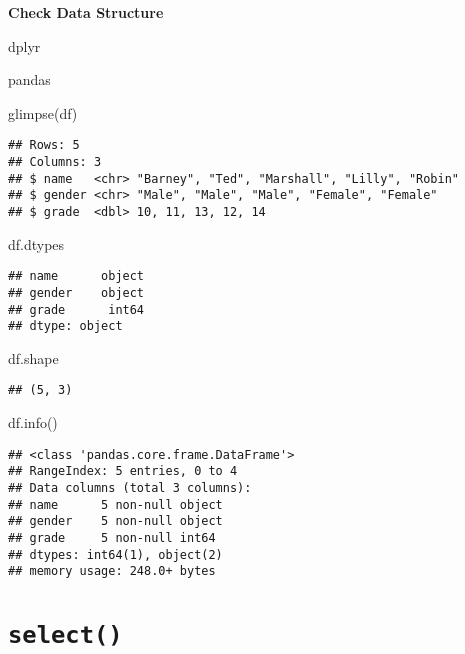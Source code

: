 \documentclass[
]{book}
\newenvironment{Shaded}{\begin{snugshade}}{\end{snugshade}}
\newcommand{\FunctionTok}[1]{\textcolor[rgb]{0.00,0.00,0.00}{#1}}
\newcommand{\NormalTok}[1]{#1}
\begin{document}
{\textbf{Check Data Structure}}

dplyr

pandas

\begin{Shaded}
\begin{Highlighting}[]
\FunctionTok{glimpse}\NormalTok{(df)}
\end{Highlighting}
\end{Shaded}

\begin{verbatim}
## Rows: 5
## Columns: 3
## $ name   <chr> "Barney", "Ted", "Marshall", "Lilly", "Robin"
## $ gender <chr> "Male", "Male", "Male", "Female", "Female"
## $ grade  <dbl> 10, 11, 13, 12, 14
\end{verbatim}

\begin{Shaded}
\begin{Highlighting}[]
\NormalTok{df.dtypes}
\end{Highlighting}
\end{Shaded}

\begin{verbatim}
## name      object
## gender    object
## grade      int64
## dtype: object
\end{verbatim}

\begin{Shaded}
\begin{Highlighting}[]
\NormalTok{df.shape}
\end{Highlighting}
\end{Shaded}

\begin{verbatim}
## (5, 3)
\end{verbatim}

\begin{Shaded}
\begin{Highlighting}[]
\NormalTok{df.info()}
\end{Highlighting}
\end{Shaded}

\begin{verbatim}
## <class 'pandas.core.frame.DataFrame'>
## RangeIndex: 5 entries, 0 to 4
## Data columns (total 3 columns):
## name      5 non-null object
## gender    5 non-null object
## grade     5 non-null int64
## dtypes: int64(1), object(2)
## memory usage: 248.0+ bytes
\end{verbatim}

\hypertarget{select}{%
\section{\texorpdfstring{\texttt{select()}}{select()}}\label{select}}
\end{document}
